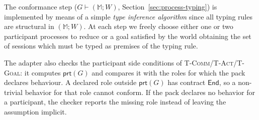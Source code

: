 \documentclass{article}
\theoremstyle{plain}
\theoremstyle{definition}
\newcommand{\id}[1]{\texttt{#1}}
\newcommand{\MM}{\mathbb{M}}
\newcommand{\prt}[1]{\mathsf{prt}(#1)}
\newcommand{\End}{\mathsf{End}}
\def \bmr {}
\def \emr {}
\begin{document}
The conformance step ($G\vdash(\MM;W)$, Section~\ref{sec:process-typing}) is
\bmr implemented by means of a simple \emph{type inference algorithm} since all typing rules are structural in $(\MM;W)$.
At each step we freely choose either one or two participant processes to reduce or a goal satisfied by the world obtaining the set of sessions which must be typed
as premises of the typing rule. \emr

The adapter also checks the participant side conditions of
\textsc{T-Comm}/\textsc{T-Act}/\textsc{T-Goal}: it computes $\prt G$ and
compares it with the roles for which the pack declares behaviour. A declared
role outside $\prt G$ has contract $\End$, so a non-trivial behavior for that
role cannot conform. If the pack declares no behavior for a participant, the
checker reports the missing role instead of leaving the assumption implicit.
\end{document}
